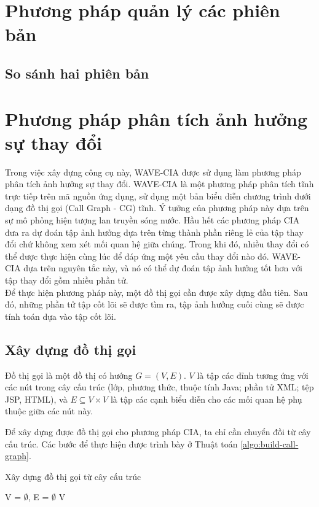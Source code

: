 \documentclass[12pt,a4paper]{report}
\newenvironment{thuattoan}[1][h]
  {\renewcommand{\algorithmcfname}{Thuật toán}
   \begin{algorithm}[#1]
  }{\end{algorithm}}
\begin{document}
\chapter{Phương pháp quản lý các phiên bản}
\section{So sánh hai phiên bản}
\chapter{Phương pháp phân tích ảnh hưởng sự thay đổi}
Trong việc xây dựng công cụ này, WAVE-CIA được sử dụng làm phương pháp phân tích ảnh hưởng sự thay đổi. WAVE-CIA là một phương pháp phân tích tĩnh trực tiếp trên mã nguồn ứng dụng, sử dụng một bản biểu diễn chương trình dưới dạng đồ thị gọi (Call Graph - CG) tĩnh. Ý tưởng của phương pháp này dựa trên sự mô phỏng hiện tượng lan truyền sóng nước. Hầu hết các phương pháp CIA đưa ra dự đoán tập ảnh hưởng dựa trên từng thành phần riêng lẻ của tập thay đổi chứ không xem xét mối quan hệ giữa chúng. Trong khi đó, nhiều thay đổi có thể được thực hiện cùng lúc để đáp ứng một yêu cầu thay đổi nào đó. WAVE-CIA dựa trên nguyên tắc này, và nó có thể dự đoán tập ảnh hưởng tốt hơn với tập thay đổi gồm nhiều phần tử.\\

Để thực hiện phương pháp này, một đồ thị gọi cần được xây dựng đầu tiên. Sau đó, những phần tử tập cốt lõi sẽ được tìm ra, tập ảnh hưởng cuối cùng sẽ được tính toán dựa vào tập cốt lõi.\\

\section{Xây dựng đồ thị gọi}
Đồ thị gọi là một đồ thị có hướng $G = (V, E)$. $V$ là tập các đỉnh tương ứng với các nút trong cây cấu trúc (lớp, phương thức, thuộc tính Java; phần tử XML; tệp JSP, HTML), và $E \subseteq V \times V$ là tập các cạnh biểu diễn cho các mối quan hệ phụ thuộc giữa các nút này.

Để xây dựng được đồ thị gọi cho phương pháp CIA, ta chỉ cần chuyển đồi từ cây cấu trúc. Các bước để thực hiện được trình bày ở Thuật toán \ref{algo:build-call-graph}.\\

\begin{thuattoan}
\label{algo:build-call-graph}
\caption{Xây dựng đồ thị gọi từ cây cấu trúc}
 V = $\emptyset$, E = $\emptyset$\;
  \Return V\;
\end{thuattoan}
\end{document}
